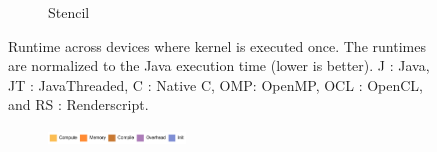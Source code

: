 \begin{figure}
\begin{subfigure}[b]{0.33\textwidth}
      \caption{Stencil}
  \end{subfigure}
  \caption{Runtime across devices where kernel is executed once. The runtimes are normalized to the Java execution time (lower is better). J : Java, JT : JavaThreaded, C : Native C, OMP: OpenMP, OCL : OpenCL, and RS : Renderscript.}
  \label{fig:perfOne}
\end{figure}

\begin{figure}

  \centering
  \begin{subfigure}[b]{\textwidth}
          \centering
          \includegraphics[width=0.4\textwidth]{data/legend.pdf}
  \end{subfigure}


\end{figure}
